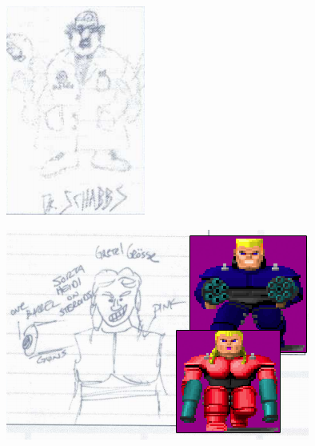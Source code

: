 \documentclass[book.tex]{subfiles}
\begin{document}
     \begin{figure}[H]
\centering
     \includegraphics[width=\textwidth]{imgs/tom_hall_sketch_dr_schabbs.png}
   \end{figure}
 
  \begin{figure}[H]
\centering
 \includegraphics[scale=0.8]{imgs/tom_hall_sketch_gretel.png}\\
 \end{figure}
\end{document}
